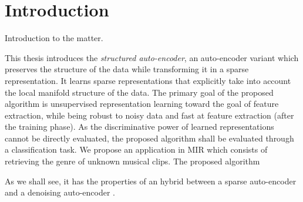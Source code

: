\documentclass[a4paper,12pt,oneside]{report}
\begin{document}
\tableofcontents
\pagestyle{fancy}





\chapter*{Introduction}

{\color{red} Introduction to the matter.}


This thesis introduces the \textit{structured auto-encoder}, an auto-encoder variant which preserves the structure of the data while transforming it in a sparse representation. It learns sparse representations that explicitly take into account the local manifold structure of the data.
The primary goal of the proposed algorithm is unsupervised representation learning toward the goal of feature extraction, while being robust to noisy data and fast at feature extraction (after the training phase). As the discriminative power of learned representations cannot be directly evaluated, the proposed algorithm shall be evaluated through a classification task.
We propose an application in \gls{MIR} which consists of retrieving the genre of unknown musical clips. The proposed algorithm 

As we shall see, it has the properties of an hybrid between a sparse auto-encoder \cite{lecun2006sparseAutoencoders, ranzato2007stackedSparseAutoencoders} and a denoising auto-encoder \cite{bengio2008denoisingAutoencoders}.
\end{document}
